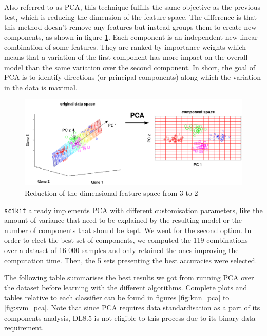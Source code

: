 Also referred to as PCA, this technique fulfills the same objective as the previous test, which is reducing the dimension of the feature space. The difference is that this method doesn't remove any features but instead groups them to create new components, as shown in figure \ref{fig:PCA}. Each component is an independent new linear combination of some features. They are ranked by importance weights which means that a variation of the first component has more impact on the overall model than the same variation over the second component. In short, the goal of PCA is to identify directions (or principal components) along which the variation in the data is maximal. 
\begin{figure}[!ht]
\centering
  \includegraphics[width=0.80\linewidth]{Figures/PCA.png}
  \caption{Reduction of the dimensional feature space from 3 to 2 \cite{pca_source}}
  \label{fig:PCA}
\end{figure}
\texttt{scikit} already implements PCA with different customisation parameters, like the amount of variance that need to be explained by the resulting model or the number of components that should be kept. We went for the second option. In order to elect the best set of components, we computed the 119 combinations over a dataset of 16 000 samples and only retained the ones improving the computation time. Then, the 5 sets presenting the best accuracies were selected.

The following table summarises the best results we got from running PCA over the dataset before learning with the different algorithms. Complete plots and tables relative to each classifier can be found in figures \ref{fig:knn_pca} to \ref{fig:svm_pca}. Note that since PCA requires data standardisation as a part of its components analysis, DL8.5 is not eligible to this process due to its binary data requirement.


